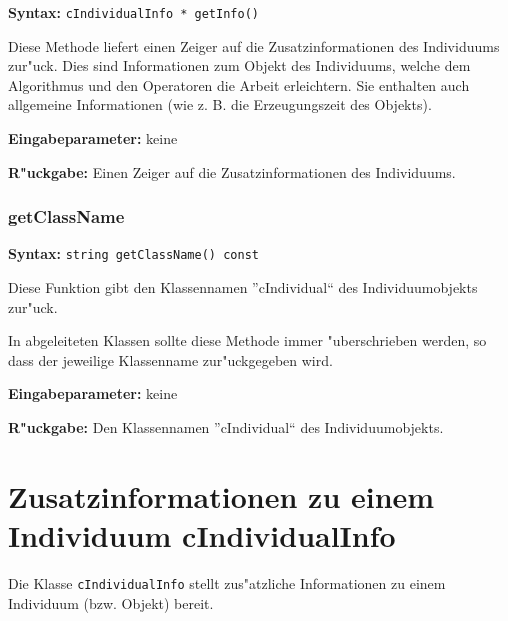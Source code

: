 \textbf{Syntax:} \verb|cIndividualInfo * getInfo()|

\bigskip\noindent
Diese Methode liefert einen Zeiger auf die Zusatzinformationen des Individuums zur"uck. Dies sind Informationen zum Objekt des Individuums, welche dem Algorithmus und den Operatoren die Arbeit erleichtern. Sie enthalten auch allgemeine Informationen (wie z. B. die Erzeugungszeit des Objekts).

\bigskip\noindent
\textbf{Eingabeparameter:} keine

\bigskip\noindent
\textbf{R"uckgabe:} Einen Zeiger auf die Zusatzinformationen des Individuums.


\subsubsection{getClassName}

\textbf{Syntax:} \verb|string getClassName() const|

\bigskip\noindent
Diese Funktion gibt den Klassennamen ''cIndividual`` des Individuumobjekts zur"uck.

In abgeleiteten Klassen sollte diese Methode immer "uberschrieben werden, so dass der jeweilige Klassenname zur"uckgegeben wird.

\bigskip\noindent
\textbf{Eingabeparameter:} keine

\bigskip\noindent
\textbf{R"uckgabe:} Den Klassennamen ''cIndividual`` des Individuumobjekts.



\section{Zusatzinformationen zu einem Individuum cIndividualInfo}
\label{secCIndividualInfo}

Die Klasse \verb|cIndividualInfo| stellt zus"atzliche Informationen zu einem Individuum (bzw. Objekt) bereit.

